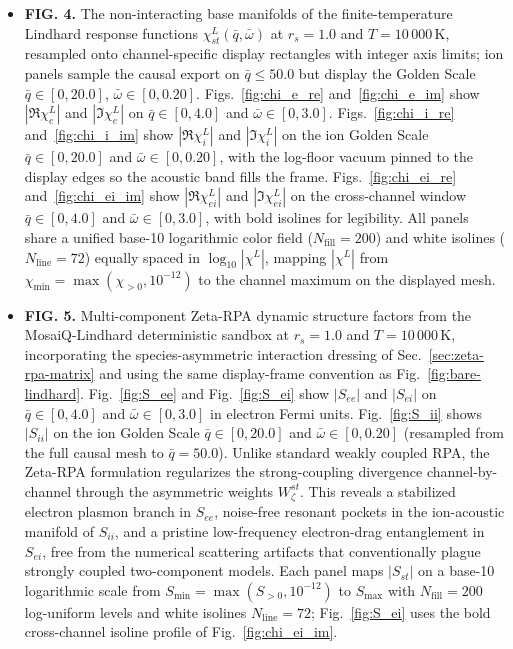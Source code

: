 \documentclass[aps,showkeys,noshowpacs,superscriptaddress,pre,preprint]{revtex4-2}
\begin{document}
\begin{itemize}
    \item \textbf{FIG. 4.} The non-interacting base manifolds of the finite-temperature Lindhard response functions $\chi_{st}^L(\bar{q}, \bar{\omega})$ at $r_s = 1.0$ and $T = 10\,000\,\mathrm{K}$, resampled onto channel-specific display rectangles with integer axis limits; ion panels sample the causal export on $\bar{q} \le 50.0$ but display the Golden Scale $\bar{q} \in [0, 20.0]$, $\bar{\omega} \in [0, 0.20]$.
    Figs.~\ref{fig:chi_e_re} and~\ref{fig:chi_e_im} show $|\Re \chi_{e}^L|$ and $|\Im \chi_{e}^L|$ on $\bar{q} \in [0, 4.0]$ and $\bar{\omega} \in [0, 3.0]$.
    Figs.~\ref{fig:chi_i_re} and~\ref{fig:chi_i_im} show $|\Re \chi_{i}^L|$ and $|\Im \chi_{i}^L|$ on the ion Golden Scale $\bar{q} \in [0, 20.0]$ and $\bar{\omega} \in [0, 0.20]$, with the log-floor vacuum pinned to the display edges so the acoustic band fills the frame.
    Figs.~\ref{fig:chi_ei_re} and~\ref{fig:chi_ei_im} show $|\Re \chi_{ei}^L|$ and $|\Im \chi_{ei}^L|$ on the cross-channel window $\bar{q} \in [0, 4.0]$ and $\bar{\omega} \in [0, 3.0]$, with bold isolines for legibility.
    All panels share a unified base-10 logarithmic color field ($N_{\mathrm{fill}}=200$) and white isolines ($N_{\mathrm{line}}=72$) equally spaced in $\log_{10}|\chi^L|$, mapping $|\chi^L|$ from $\chi_{\min}=\max(\chi_{>0},10^{-12})$ to the channel maximum on the displayed mesh.

    \item \textbf{FIG. 5.} Multi-component Zeta-RPA dynamic structure factors from the MosaiQ-Lindhard deterministic sandbox at $r_s = 1.0$ and $T = 10\,000\,\mathrm{K}$, incorporating the species-asymmetric interaction dressing of Sec.~\ref{sec:zeta-rpa-matrix} and using the same display-frame convention as Fig.~\ref{fig:bare-lindhard}.
    Fig.~\ref{fig:S_ee} and Fig.~\ref{fig:S_ei} show $|S_{ee}|$ and $|S_{ei}|$ on $\bar{q} \in [0, 4.0]$ and $\bar{\omega} \in [0, 3.0]$ in electron Fermi units.
    Fig.~\ref{fig:S_ii} shows $|S_{ii}|$ on the ion Golden Scale $\bar{q} \in [0, 20.0]$ and $\bar{\omega} \in [0, 0.20]$ (resampled from the full causal mesh to $\bar{q} = 50.0$).
    Unlike standard weakly coupled RPA, the Zeta-RPA formulation regularizes the strong-coupling divergence channel-by-channel through the asymmetric weights $W_\zeta^{st}$.
    This reveals a stabilized electron plasmon branch in $S_{ee}$, noise-free resonant pockets in the ion-acoustic manifold of $S_{ii}$, and a pristine low-frequency electron-drag entanglement in $S_{ei}$, free from the numerical scattering artifacts that conventionally plague strongly coupled two-component models.
    Each panel maps $|S_{st}|$ on a base-10 logarithmic scale from $S_{\min}=\max(S_{>0},10^{-12})$ to $S_{\max}$ with $N_{\mathrm{fill}}=200$ log-uniform levels and white isolines $N_{\mathrm{line}}=72$; Fig.~\ref{fig:S_ei} uses the bold cross-channel isoline profile of Fig.~\ref{fig:chi_ei_im}.


\end{itemize}
\end{document}
